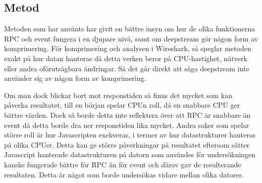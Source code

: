 \subsection{Metod}
\label{subsec:tim-discussion-method}
Metoden som har använts har givit en bättre insyn om hur de olika funktionerna RPC och event fungera i en djupare nivå, samt om deepstream gör någon form av komprimering. För komprimering och analysen i Wireshark, så speglar metoden exakt på hur datan hanteras då detta verken beror på CPU-hastighet, nätverk eller andra oförutsägbara ändringar. Så det går direkt att säga deepstream inte använder sig av någon form av komprimering.

Om man dock blickar bort mot responstiden så finns det mycket som kan påverka resultatet, till en början spelar CPUn roll, då en snabbare CPU ger bättre värden. Dock så borde detta inte reflektera över att RPC är snabbare än event då detta borde dra ner responstiden lika mycket. Andra saker som spelar större roll är hur Javascripten exekveras, i termer av hur datastrukturer hanteras på olika CPUer. Detta kan ge större påverkningar på resultatet eftersom sätter Javascript hanterade datastrukturen på datorn som användes för undersökningen kanske fungerade bättre för RPC än för event och därav gav de resulterande resultaten. Detta är något som borde undersökas vidare mellan olika datorer.
